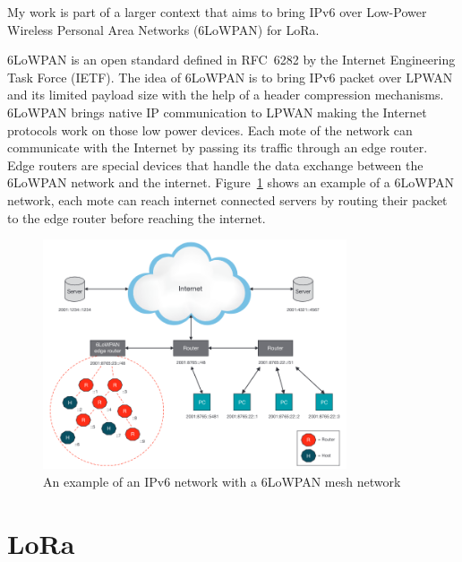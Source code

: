 My work is part of a larger context that aims to bring IPv6 over Low-Power
Wireless Personal Area Networks (6LoWPAN) for LoRa.

6LoWPAN is an open standard defined in RFC~6282 by the Internet Engineering
Task Force (IETF).
The idea of 6LoWPAN is to bring IPv6 packet over LPWAN and its limited payload
size with the help of a header compression mechanisms.
6LoWPAN brings native IP communication to LPWAN making the Internet protocols
work on those low power devices.
Each mote of the network can communicate with the Internet by passing its
traffic through an edge router.
Edge routers are special devices that handle the data exchange between the
6LoWPAN network and the internet.
Figure~\ref{fig:6lowpan} shows an example of a 6LoWPAN network, each mote
can reach internet connected servers by routing their packet to the edge
router before reaching the internet.

\begin{figure}[H]
  \centering
  \includegraphics[width=0.8\textwidth]{thesis.tex/chapters/context/fig/6lowpan.png}
  \caption{An example of an IPv6 network with a 6LoWPAN mesh network\cite{olsson20146lowpan}\label{fig:6lowpan}}
\end{figure}


\section{LoRa\label{section:lora}}


